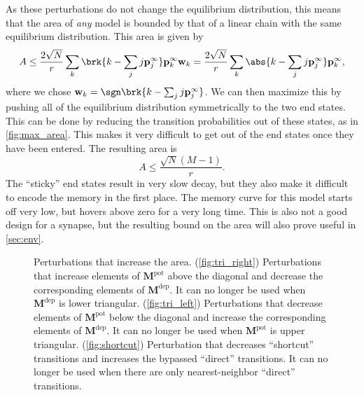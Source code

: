 \documentclass{article} %
\newcommand{\pr}{\mathbf{p}}
\newcommand{\eq}{\pr^\infty}
\newcommand{\w}{\mathbf{w}}
\newcommand{\M}{\mathbf{M}}
\newcommand{\pot}{^{\text{pot}}}
\newcommand{\dep}{^{\text{dep}}}
\begin{document}
As these perturbations do not change the equilibrium distribution, this means that the area of \emph{any} model is bounded by that of a linear chain with the same equilibrium distribution.
This area is given by 
%
\begin{equation}\label{eq:multistatearea}
  A \leq \frac{2\sqrt{N}}{r} \sum_k \brk{k - \sum_j j\eq_j} \eq_k \w_k
    = \frac{2\sqrt{N}}{r} \sum_k \abs{k - \sum_j j\eq_j} \eq_k ,
\end{equation}
%
where we chose $\w_k=\sgn\brk{k - \sum_j j\eq_j}$.
We can then maximize this by pushing all of the equilibrium distribution symmetrically to the two end states.
This can be done by reducing the transition probabilities out of these states, as in \autoref{fig:max_area}.
This makes it very difficult to get out of the end states once they have been entered.
The resulting area is
%
\begin{equation}\label{eq:max_area}
  A \leq \frac{\sqrt{N}(M-1)}{r}.
\end{equation}
%
The ``sticky'' end states result in very slow decay, but they also make it difficult to encode the memory in the first place.
The memory curve for this model starts off very low, but hovers above zero for a very long time.
This is also not a good design for a synapse, but the resulting bound on the area will also prove useful in \autoref{sec:env}.


\begin{figure}
 \begin{center}
 \begin{myenuma}
  \item{}\label{fig:tri_right}\hp
  \item{}\label{fig:tri_left}\hp
  \item{}\label{fig:shortcut}
 \end{myenuma}
 \end{center}
  \caption{Perturbations that increase the area.
  (\ref{fig:tri_right}) Perturbations that increase elements of $\M\pot$ above the diagonal and decrease the corresponding elements of $\M\dep$. It can no longer be used when $\M\dep$ is lower triangular.
  (\ref{fig:tri_left}) Perturbations that decrease elements of $\M\pot$ below the diagonal and increase the corresponding elements of $\M\dep$. It can no longer be used when $\M\pot$ is upper triangular.
  (\ref{fig:shortcut}) Perturbation that decreases ``shortcut'' transitions and increases the bypassed ``direct'' transitions. It can no longer be used when there are only nearest-neighbor ``direct'' transitions.
  }\label{fig:perts}
\end{figure}
\end{document}
